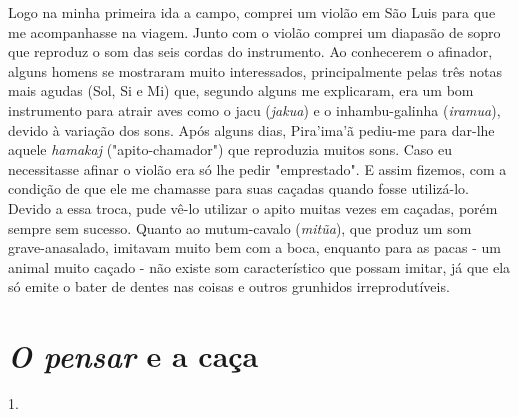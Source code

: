Logo na minha primeira ida a campo, comprei um violão em São Luis para
que me acompanhasse na viagem. Junto com o violão comprei um diapasão de
sopro que reproduz o som das seis cordas do instrumento. Ao conhecerem o
afinador, alguns homens se mostraram muito interessados, principalmente
pelas três notas mais agudas (Sol, Si e Mi) que, segundo alguns me
explicaram, era um bom instrumento para atrair aves como o jacu
(\emph{jakua}) e o inhambu-galinha (\emph{iramua}), devido à variação
dos sons. Após alguns dias, Pira'ima'ã pediu-me para dar-lhe aquele
\emph{hamakaj} ("apito-chamador") que reproduzia muitos sons. Caso eu
necessitasse afinar o violão era só lhe pedir "emprestado". E assim
fizemos, com a condição de que ele me chamasse para suas caçadas quando
fosse utilizá-lo. Devido a essa troca, pude vê-lo utilizar o apito
muitas vezes em caçadas, porém sempre sem sucesso. Quanto ao
mutum-cavalo (\emph{mitũa}), que produz um som grave-anasalado, imitavam
muito bem com a boca, enquanto para as pacas - um animal muito caçado -
não existe som característico que possam imitar, já que ela só emite o
bater de dentes nas coisas e outros grunhidos irreprodutíveis.

\section{\emph{O pensar} e a caça}

1.

